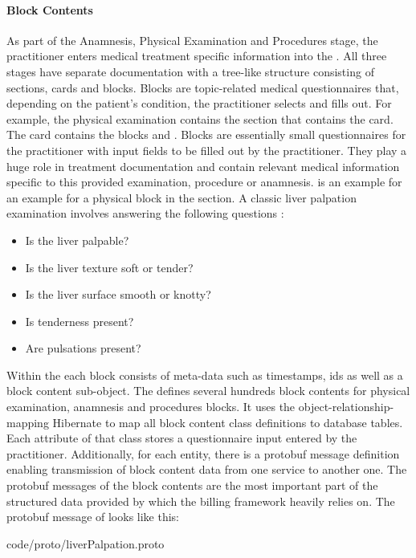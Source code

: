 \paragraph{Block Contents}
As part of the Anamnesis, Physical Examination and Procedures stage,
the practitioner enters medical treatment specific information into the \AVS.
All three stages have separate documentation with a tree-like structure consisting of sections, cards and blocks.
Blocks are topic-related medical questionnaires that, depending on the patient's condition, the practitioner selects and fills out.
For example, the physical examination contains the section  that contains the  card.
The  card contains the blocks  and .
Blocks are essentially small questionnaires for the practitioner with input fields to be filled out by the practitioner.
They play a huge role in treatment documentation and contain relevant medical information specific to this provided examination, procedure or anamnesis.
 is an example for an example for a physical block in the  section.
A classic liver palpation examination involves answering the following questions \cite{wolf1990evaluation}:
\begin{itemize}
    \item Is the liver palpable?
    \item Is the liver texture soft or tender?
    \item Is the liver surface smooth or knotty?
    \item Is tenderness present?
    \item Are pulsations present?
\end{itemize}
Within the \AVS each block consists of meta-data such as timestamps, ids as well as a block content sub-object.
The \AVS defines several hundreds block contents for physical examination, anamnesis and procedures blocks.
It uses the object-relationship-mapping Hibernate to map all block content class definitions to database tables.
Each attribute of that class stores a questionnaire input entered by the practitioner.
Additionally, for each entity, there is a protobuf message definition enabling transmission of block content data from one service
to another one.
The protobuf messages of the block contents are the most important part of the structured data provided by \AV which the billing framework heavily relies on.
The protobuf message of  looks like this:

{code/proto/liverPalpation.proto}



